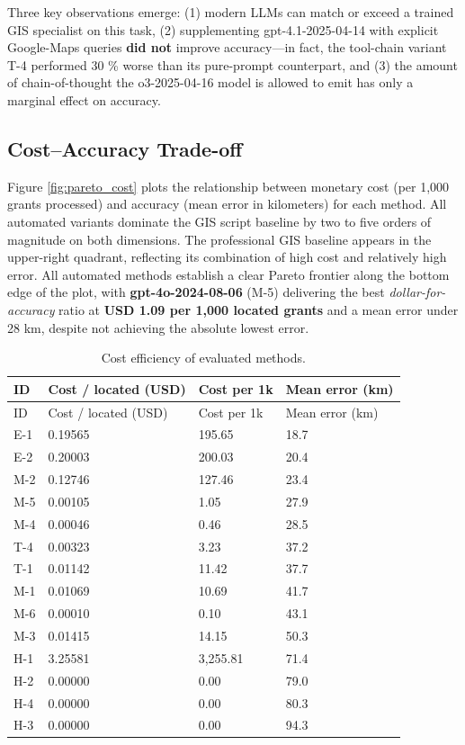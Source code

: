 Three key observations emerge: (1) modern LLMs can match or exceed a
trained GIS specialist on this task, (2) supplementing
gpt-4.1-2025-04-14 with explicit Google-Maps queries \textbf{did not}
improve accuracy---in fact, the tool-chain variant T-4 performed 30 \%
worse than its pure-prompt counterpart, and (3) the amount of
chain-of-thought the o3-2025-04-16 model is allowed to emit has only a
marginal effect on accuracy.

\clearpage

\subsection{Cost--Accuracy Trade-off}\label{costaccuracy-trade-off}

Figure \ref{fig:pareto_cost} plots the relationship between monetary
cost (per 1,000 grants processed) and accuracy (mean error in
kilometers) for each method. All automated variants dominate the GIS
script baseline by two to five orders of magnitude on both dimensions.
The professional GIS baseline appears in the upper-right quadrant,
reflecting its combination of high cost and relatively high error. All
automated methods establish a clear Pareto frontier along the bottom
edge of the plot, with \textbf{gpt-4o-2024-08-06} (M-5) delivering the
best \emph{dollar-for-accuracy} ratio at \textbf{USD 1.09 per 1,000
located grants} and a mean error under 28 km, despite not achieving the
absolute lowest error.

\begin{longtable}[]{@{}llll@{}}
\caption{\label{tbl:cost}Cost efficiency of evaluated
methods.}\tabularnewline
\toprule\noalign{}
ID & Cost / located (USD) & Cost per 1k & Mean error (km) \\
\midrule\noalign{}
\endfirsthead
\toprule\noalign{}
ID & Cost / located (USD) & Cost per 1k & Mean error (km) \\
\midrule\noalign{}
\endhead
\bottomrule\noalign{}
\endlastfoot
E-1 & 0.19565 & 195.65 & 18.7 \\
E-2 & 0.20003 & 200.03 & 20.4 \\
M-2 & 0.12746 & 127.46 & 23.4 \\
M-5 & 0.00105 & 1.05 & 27.9 \\
M-4 & 0.00046 & 0.46 & 28.5 \\
T-4 & 0.00323 & 3.23 & 37.2 \\
T-1 & 0.01142 & 11.42 & 37.7 \\
M-1 & 0.01069 & 10.69 & 41.7 \\
M-6 & 0.00010 & 0.10 & 43.1 \\
M-3 & 0.01415 & 14.15 & 50.3 \\
H-1 & 3.25581 & 3,255.81 & 71.4 \\
H-2 & 0.00000 & 0.00 & 79.0 \\
H-4 & 0.00000 & 0.00 & 80.3 \\
H-3 & 0.00000 & 0.00 & 94.3 \\
\end{longtable}

